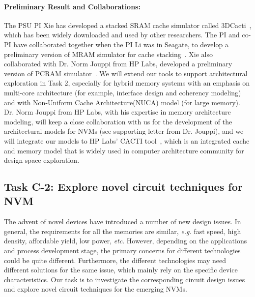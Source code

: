 \paragraph{Preliminary Result and Collaborations:}  The PSU PI Xie has developed a stacked SRAM cache
simulator called 3DCacti~\cite{xie:iccd05-3d, XIE:TVLSI2008-3DCacti},
which has been widely downloaded and used by other researchers.
The PI and co-PI have collaborated together when the PI Li was in Seagate,
to develop a preliminary version of MRAM simulator for cache stacking~\cite{MRAM:DONG08,XIE:HPCA09}.
Xie also collaborated with Dr. Norm Jouppi
from HP Labs, developed a preliminary version of PCRAM simulator~\cite{xie:pcramsim}.
We will extend our tools to support architectural exploration in Task 2, especially
for hybrid memory systems with an emphasis on multi-core architecture
(for example, interface design and coherency modeling)
and with Non-Uniform Cache Architecture(NUCA) model (for large
memory). Dr. Norm Jouppi from HP Labs,
with his expertise in memory architecture modeling, will keep a close
collaboration with us for the development of the architectural models for NVMs (see supporting letter
from Dr. Jouppi), and we will integrate our models to HP Labs' CACTI tool~\cite{CACTI}, which is an integrated cache and memory model that is widely used in computer architecture community for design space exploration.


\subsection{Task C-2: Explore novel circuit techniques for NVM}
\label{C2-Circuit}

The advent of novel devices have introduced a number of new design issues. In general, the requirements for all the memories are similar, \emph{e.g.} fast speed, high density, affordable yield, low power, \emph{etc}. However, depending on the applications and process development stage, the primary concerns for different technologies could be quite different. Furthermore, the different technologies may need different solutions for the same issue, which mainly rely on the specific device characteristics. Our task is to investigate the corresponding circuit design issues and explore novel circuit techniques for the emerging NVMs.

